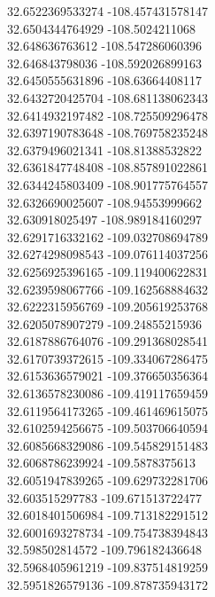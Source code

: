 {32.6522369533274	-108.457431578147\\
32.6504344764929	-108.5024211068\\
32.648636763612	-108.547286060396\\
32.646843798036	-108.592026899163\\
32.6450555631896	-108.63664408117\\
32.6432720425704	-108.681138062343\\
32.6414932197482	-108.725509296478\\
32.6397190783648	-108.769758235248\\
32.6379496021341	-108.81388532822\\
32.6361847748408	-108.857891022861\\
32.6344245803409	-108.901775764557\\
32.6326690025607	-108.94553999662\\
32.630918025497	-108.989184160297\\
32.6291716332162	-109.032708694789\\
32.6274298098543	-109.076114037256\\
32.6256925396165	-109.119400622831\\
32.6239598067766	-109.162568884632\\
32.6222315956769	-109.205619253768\\
32.6205078907279	-109.24855215936\\
32.6187886764076	-109.291368028541\\
32.6170739372615	-109.334067286475\\
32.6153636579021	-109.376650356364\\
32.6136578230086	-109.419117659459\\
32.6119564173265	-109.461469615075\\
32.6102594256675	-109.503706640594\\
32.6085668329086	-109.545829151483\\
32.6068786239924	-109.5878375613\\
32.6051947839265	-109.629732281706\\
32.603515297783	-109.671513722477\\
32.6018401506984	-109.713182291512\\
32.6001693278734	-109.754738394843\\
32.598502814572	-109.796182436648\\
32.5968405961219	-109.837514819259\\
32.5951826579136	-109.878735943172\\
}
